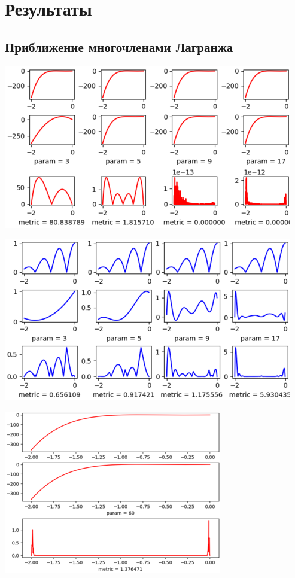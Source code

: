 \documentclass{article}
\begin{document}
\section{Результаты}

\subsection{Приближение многочленами Лагранжа}
\includegraphics{Figure_102.png}

\includegraphics{Figure_103.png}

\includegraphics{Figure_104.png}
\end{document}
